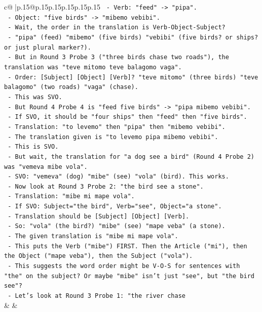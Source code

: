 \documentclass{article}
\begin{document}
{\begin{supertabular}{c@{$\;$}|p{.15\linewidth}@{}p{.15\linewidth}p{.15\linewidth}p{.15\linewidth}p{.15\linewidth}p{.15\linewidth}}
{{{\texttt{    {-} Verb: "feed" {-}> "pipa".} \\
\texttt{    {-} Object: "five birds" {-}> "mibemo vebibi".} \\
\texttt{    {-} Wait, the order in the translation is Verb{-}Object{-}Subject?} \\
\texttt{    {-} "pipa" (feed) "mibemo" (five birds) "vebibi" (five birds? or ships? or just plural marker?).} \\
\texttt{    {-} But in Round 3 Probe 3 ("three birds chase two roads"), the translation was "teve mitomo teve balagomo vaga".} \\
\texttt{      {-} Order: {[}Subject{]} {[}Object{]} {[}Verb{]}? "teve mitomo" (three birds) "teve balagomo" (two roads) "vaga" (chase).} \\
\texttt{      {-} This was SVO.} \\
\texttt{    {-} But Round 4 Probe 4 is "feed five birds" {-}> "pipa mibemo vebibi".} \\
\texttt{      {-} If SVO, it should be "four ships" then "feed" then "five birds".} \\
\texttt{      {-} Translation: "to levemo" then "pipa" then "mibemo vebibi".} \\
\texttt{      {-} The translation given is "to levemo pipa mibemo vebibi".} \\
\texttt{      {-} This is SVO.} \\
\texttt{      {-} But wait, the translation for "a dog see a bird" (Round 4 Probe 2) was "vemeva mibe vola".} \\
\texttt{      {-} SVO: "vemeva" (dog) "mibe" (see) "vola" (bird). This works.} \\
\texttt{    {-} Now look at Round 3 Probe 2: "the bird see a stone".} \\
\texttt{      {-} Translation: "mibe mi mape vola".} \\
\texttt{      {-} If SVO: Subject="the bird", Verb="see", Object="a stone".} \\
\texttt{      {-} Translation should be {[}Subject{]} {[}Object{]} {[}Verb{]}.} \\
\texttt{      {-} So: "vola" (the bird?) "mibe" (see) "mape veba" (a stone).} \\
\texttt{      {-} The given translation is "mibe mi mape vola".} \\
\texttt{      {-} This puts the Verb ("mibe") FIRST. Then the Article ("mi"), then the Object ("mape veba"), then the Subject ("vola").} \\
\texttt{      {-} This suggests the word order might be V{-}O{-}S for sentences with "the" on the subject? Or maybe "mibe" isn't just "see", but "the bird see"?} \\
\texttt{      {-} Let's look at Round 3 Probe 1: "the river chase} \\
            }
        }
    }
    & & \\ \\


\end{supertabular}}
\end{document}
